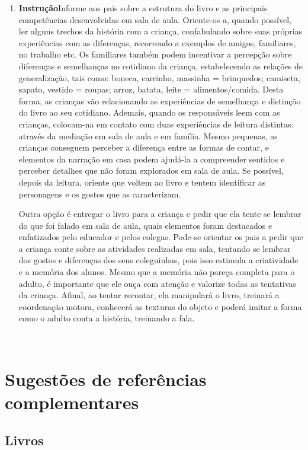 \documentclass[11pt]{extarticle}
\begin{document}
\begin{enumerate}
\item \textbf{Instrução}\quad Informe aos pais sobre a estrutura do livro e as principais competências desenvolvidas em sala de aula.
Oriente-os a, quando possível, ler alguns trechos da história com a criança, confabulando sobre suas próprias experiências com as diferenças, recorrendo a exemplos de amigos, familiares, no trabalho etc.
Os familiares também podem incentivar a percepção sobre diferenças e semelhanças no cotidiano da criança, estabelecendo as relações de generalização, tais como: boneca, carrinho, massinha = brinquedos; camiseta, sapato, vestido = roupas; arroz, batata, leite = alimentos/comida.  
Desta forma, as crianças vão relacionando as experiências de semelhança e distinção do livro ao seu cotidiano.
Ademais, quando os responsáveis leem com as crianças, colocam-na em contato com duas experiências de leitura distintas: através da mediação em sala de aula e em família. 
Mesmo pequenas, as crianças conseguem perceber a diferença entre 
as formas de contar, e elementos da narração em casa podem ajudá-la a compreender 
sentidos e perceber detalhes que não foram explorados em sala de aula. Se possível, depois da leitura, oriente 
que voltem ao livro e tentem identificar as personagens e os gostos que as caracterizam.

Outra opção é entregar o livro para a criança e pedir que ela tente se lembrar
do que foi falado em sala de aula, quais elementos foram destacados e enfatizados pelo educador e pelos colegas. Pode-se orientar os pais a pedir que a criança conte sobre as atividades realizadas em sala, tentando se lembrar dos gostos e diferenças dos seus coleguinhas, pois isso estimula a criatividade e a memória dos alunos. Mesmo que a memória não pareça 
completa para o adulto, é importante que ele ouça com atenção e 
valorize todas as tentativas da criança. Afinal, ao tentar recontar, 
ela manipulará o livro, treinará a coordenação motora, conhecerá as texturas 
do objeto e poderá imitar a forma como o adulto 
conta a história, treinando a fala. 
\end{enumerate}

 
\section{Sugestões de referências complementares}

\subsection{Livros} 
\end{document}
